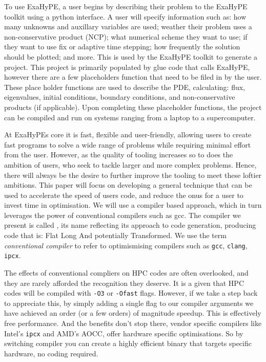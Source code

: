 To use ExaHyPE, a user begins by describing their problem to the ExaHyPE toolkit using a python interface.
A user will specify information such as: how many unknowns and auxillary variables are used; weather their problem uses a non-conservative product (NCP); what numerical scheme they want to use; if they want to use fix or adaptive time stepping; how frequently the solution should be plotted; and more.
This is used by the ExaHyPE toolkit to generate a project.
This project is primarily populated by glue code that calls ExaHyPE, however there are a few placeholders function that need to be filed in by the user.
These place holder functions are used to describe the PDE, calculating: flux, eigenvalues, initial conditions, boundary conditions, and non-conservative products (if applicable).
Upon completing these placeholder functions, the project can be compiled and run on systems ranging from a laptop to a supercomputer.

At ExaHyPEs core it is fast, flexible and user-friendly, allowing users to create fast programs to solve a wide range of problems while requiring minimal effort from the user.
However, as the quality of tooling increases so to does the ambition of users, who seek to tackle larger and more complex problems.
Hence, there will always be the desire to further improve the tooling to meet these loftier ambitions.
This paper will focus on developing a general technique that can be used to accelerate the speed of users code, and reduce the onus for a user to invest time in optimisation.
We will use a compiler based approach, which in turn leverages the power of conventional compilers such as gcc.
The compiler we present is called \phlat, its name reflecting its approach to code generation, producing code that is: Flat Long And potentially Transformed. 
We use the term \textit{conventional compiler} to refer to optimismising compilers such as \texttt{gcc}, \texttt{clang}, \texttt{ipcx}.  


The effects of conventional compliers on HPC codes are often overlooked, and they are rarely afforded the recognition they deserve.
It is a given that HPC codes will be compiled with \texttt{-O3} or \texttt{-Ofast} flags.
However, if we take a step back to appreciate this, by simply adding a single flag to our compiler arguments we have achieved an order (or a few orders) of magnitude speedup.
This is effectively free performance.
And the benefits don't stop there, vendor specific compilers like Intel's \texttt{ipcx} and AMD's AOCC, offer hardware specific optimisations.
So by switching compiler you can create a highly efficient binary that targets specific hardware, no coding required.

